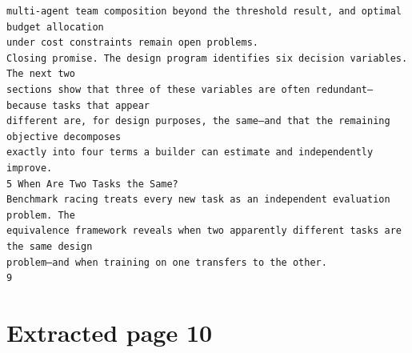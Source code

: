 \documentclass[11pt]{article}
\begin{document}
\begin{verbatim}
multi-agent team composition beyond the threshold result, and optimal budget allocation
under cost constraints remain open problems.
Closing promise. The design program identifies six decision variables. The next two
sections show that three of these variables are often redundant—because tasks that appear
different are, for design purposes, the same—and that the remaining objective decomposes
exactly into four terms a builder can estimate and independently improve.
5 When Are Two Tasks the Same?
Benchmark racing treats every new task as an independent evaluation problem. The
equivalence framework reveals when two apparently different tasks are the same design
problem—and when training on one transfers to the other.
9
\end{verbatim}

\clearpage
\section*{Extracted page 10}
\end{document}
